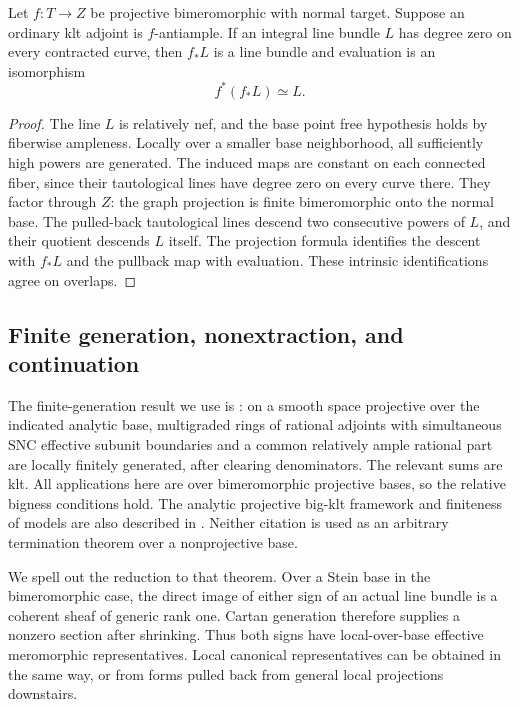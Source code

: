 \begin{lemma}
\label{bir:integral-descent}
Let $f:T\to Z$ be projective bimeromorphic with normal target.  Suppose
an ordinary klt adjoint is $f$-antiample.  If an integral line bundle
$L$ has degree zero on every contracted curve, then $f_*L$ is a line
bundle and evaluation is an isomorphism
\begin{equation}
 f^*(f_*L)\simeq L.
 \label{bir:integral-pullback}
\end{equation}
\end{lemma}

\begin{proof}
The line $L$ is relatively nef, and the base point free hypothesis
holds by fiberwise ampleness.  Locally over a smaller base neighborhood,
all sufficiently high powers are generated.  The induced maps are
constant on each connected fiber, since their tautological lines have
degree zero on every curve there.  They factor through $Z$: the graph
projection is finite bimeromorphic onto the normal base.  The pulled-back
tautological lines descend two consecutive powers of $L$, and their
quotient descends $L$ itself.  The projection formula identifies the
descent with $f_*L$ and the pullback map with evaluation.  These
intrinsic identifications agree on overlaps.
\end{proof}

\subsection{Finite generation, nonextraction, and continuation}
\label{bir:finite-generation}

The finite-generation result we use is
\cite[Theorem~3.1]{DHPFourfoldMMP}: on a smooth space projective over
the indicated analytic base, multigraded rings of rational adjoints
with simultaneous SNC effective subunit boundaries and a common
relatively ample rational part are locally finitely generated, after
clearing denominators.  The relevant sums are klt.  All applications
here are over bimeromorphic projective bases, so the relative bigness
conditions hold.  The analytic projective big-klt framework and
finiteness of models are also described in
\cite[Theorem~E]{FujinoAnalyticMMP}.  Neither citation is used as an
arbitrary termination theorem over a nonprojective base.

We spell out the reduction to that theorem.  Over a Stein base in the
bimeromorphic case, the direct image of either sign of an actual line
bundle is a coherent sheaf of generic rank one.  Cartan generation
therefore supplies a nonzero section after shrinking.  Thus both signs
have local-over-base effective meromorphic representatives.  Local
canonical representatives can be obtained in the same way, or from
forms pulled back from general local projections downstairs.

